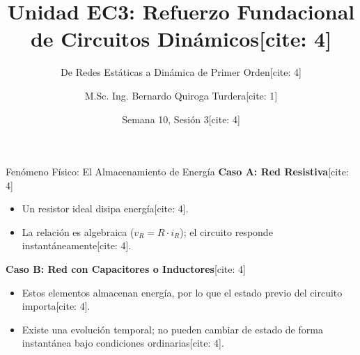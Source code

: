 \documentclass[aspectratio=169, 10pt]{beamer}
\title[Fundamentos EC3]{Unidad EC3: Refuerzo Fundacional de Circuitos Dinámicos[cite: 4]}
\subtitle{De Redes Estáticas a Dinámica de Primer Orden[cite: 4]}
\author[B. Quiroga Turdera]{M.Sc. Ing. Bernardo Quiroga Turdera[cite: 1]}
\institute[UCB Tarija]{Universidad Católica Boliviana ``San Pablo'' — Sede Tarija[cite: 1]}
\date{Semana 10, Sesión 3[cite: 4]}
\begin{document}
\begin{frame}
    \titlepage
\end{frame}

\begin{frame}{Fenómeno Físico: El Almacenamiento de Energía}
    \textbf{Caso A: Red Resistiva}[cite: 4]
    \begin{itemize}
        \item Un resistor ideal disipa energía[cite: 4].
        \item La relación es algebraica ($v_R = R \cdot i_R$); el circuito responde instantáneamente[cite: 4].
    \end{itemize}
    \vspace{0.3cm}
    \textbf{Caso B: Red con Capacitores o Inductores}[cite: 4]
    \begin{itemize}
        \item Estos elementos almacenan energía, por lo que el estado previo del circuito importa[cite: 4].
        \item Existe una evolución temporal; no pueden cambiar de estado de forma instantánea bajo condiciones ordinarias[cite: 4].
    \end{itemize}
\end{frame}
\end{document}
